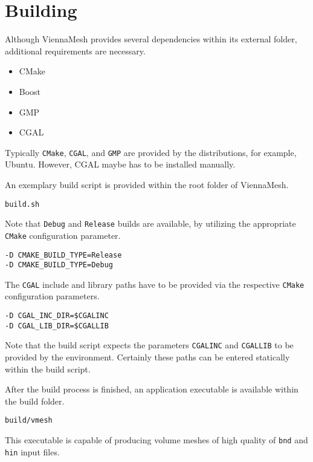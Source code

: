 \section{Building}

Although ViennaMesh provides several dependencies within its external folder, 
additional requirements are necessary.

\begin{itemize}
   \item CMake~\cite{cmake}
   \item Boost~\cite{boost}
   \item GMP~\cite{gmp}
   \item CGAL~\cite{cgal}
\end{itemize}

Typically \texttt{CMake}, \texttt{CGAL}, and \texttt{GMP} are provided by 
the distributions, for example, Ubuntu. However, CGAL maybe has to be installed manually.

An exemplary build script is provided within the root folder of ViennaMesh. 
\begin{exaipd}
\begin{Verbatim}
build.sh
\end{Verbatim}
\end{exaipd}

Note that \texttt{Debug} and \texttt{Release} builds are available, by utilizing 
the appropriate \texttt{CMake} configuration parameter.
\begin{exaipd}
\begin{Verbatim}
-D CMAKE_BUILD_TYPE=Release
-D CMAKE_BUILD_TYPE=Debug
\end{Verbatim}
\end{exaipd}

The \texttt{CGAL} include and library paths have to be provided via the 
respective \texttt{CMake} configuration parameters.
\begin{exaipd}
\begin{Verbatim}
-D CGAL_INC_DIR=$CGALINC
-D CGAL_LIB_DIR=$CGALLIB
\end{Verbatim}
\end{exaipd}

Note that the build script expects the parameters \texttt{CGALINC} and 
\texttt{CGALLIB} to be provided by the environment. 
Certainly these paths can be entered statically within the build script.

After the build process is finished, an application executable is available 
within the build folder. 
\begin{exaipd}
\begin{Verbatim}
build/vmesh
\end{Verbatim}
\end{exaipd}

This executable is capable of producing volume meshes of high quality of 
\texttt{bnd} and \texttt{hin} input files. 


